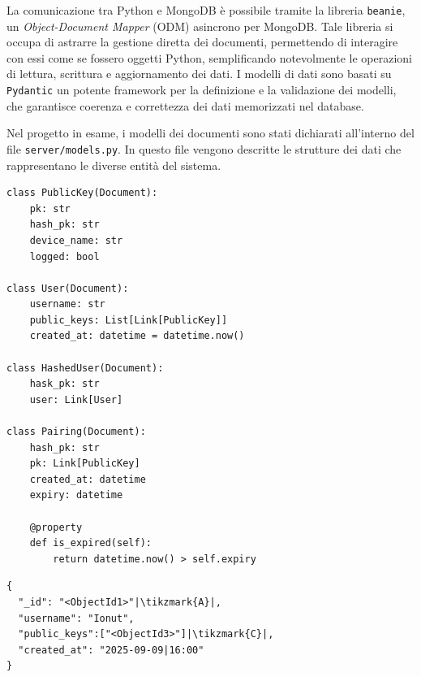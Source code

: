 La comunicazione tra Python e MongoDB è possibile tramite la libreria \texttt{beanie}\cite{beanie}, un \textit{Object-Document Mapper} (ODM) asincrono per MongoDB. Tale libreria si occupa di astrarre la gestione diretta dei documenti, permettendo di interagire con essi come se fossero oggetti Python, semplificando notevolmente le operazioni di lettura, scrittura e aggiornamento dei dati. I modelli di dati sono basati su \texttt{Pydantic}\cite{pydantic} un potente framework per la definizione e la validazione dei modelli, che garantisce coerenza e correttezza dei dati memorizzati nel database.

Nel progetto in esame, i modelli dei documenti sono stati dichiarati all'interno del file \texttt{server/models.py}. In questo file vengono descritte le strutture dei dati che rappresentano le diverse entità del sistema.

\begin{listing}[!ht]
\begin{verbatim}
class PublicKey(Document):
    pk: str
    hash_pk: str
    device_name: str
    logged: bool

class User(Document):
    username: str
    public_keys: List[Link[PublicKey]]
    created_at: datetime = datetime.now()

class HashedUser(Document):
    hask_pk: str
    user: Link[User]

class Pairing(Document):
    hash_pk: str
    pk: Link[PublicKey]
    created_at: datetime
    expiry: datetime 
    
    @property
    def is_expired(self):
        return datetime.now() > self.expiry
\end{verbatim}
\caption{Definizione dei modelli all'interno del file \texttt{server/models.py}}
\label{cod:schema_db}
\end{listing}



\newpage

\newsavebox{\lstone}
\newsavebox{\lsttwo}
\newsavebox{\lstthree}
\newsavebox{\lstfour}

\begin{lrbox}{\lstone}
\begin{minipage}{0.46\textwidth}
\begin{verbatim}
{
  "_id": "<ObjectId1>"|\tikzmark{A}|,
  "username": "Ionut",
  "public_keys":["<ObjectId3>"]|\tikzmark{C}|,
  "created_at": "2025-09-09|16:00"
}
\end{verbatim}
\end{minipage}
\end{lrbox}

